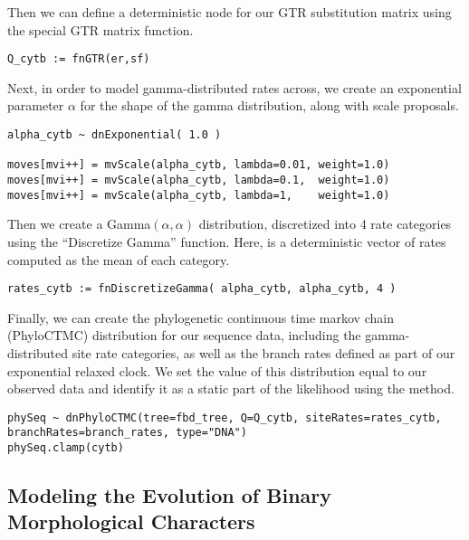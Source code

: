 Then we can define a deterministic node for our GTR substitution matrix using the special GTR matrix function.
{\tt \begin{snugshade*}
\begin{lstlisting}
Q_cytb := fnGTR(er,sf)
\end{lstlisting}
\end{snugshade*}}

Next, in order to model gamma-distributed rates across, we create an exponential parameter $\alpha$ for the shape of the gamma distribution, along with scale proposals.
{\tt \begin{snugshade*}
\begin{lstlisting}
alpha_cytb ~ dnExponential( 1.0 )

moves[mvi++] = mvScale(alpha_cytb, lambda=0.01, weight=1.0)
moves[mvi++] = mvScale(alpha_cytb, lambda=0.1,  weight=1.0)
moves[mvi++] = mvScale(alpha_cytb, lambda=1,    weight=1.0)
\end{lstlisting}
\end{snugshade*}}

Then we create a Gamma$(\alpha,\alpha)$ distribution, discretized into 4 rate categories using the ``Discretize Gamma'' function.
Here,  is a deterministic vector of rates computed as the mean of each category.
{\tt \begin{snugshade*}
\begin{lstlisting}
rates_cytb := fnDiscretizeGamma( alpha_cytb, alpha_cytb, 4 )
\end{lstlisting}
\end{snugshade*}}

Finally, we can create the phylogenetic continuous time markov chain (PhyloCTMC) distribution for our sequence data, including the gamma-distributed site rate categories, as well as the branch rates defined as part of our exponential relaxed clock.
We set the value of this distribution equal to our observed data and identify it as a static part of the likelihood using the  method.
{\tt \begin{snugshade*}
\begin{lstlisting}
phySeq ~ dnPhyloCTMC(tree=fbd_tree, Q=Q_cytb, siteRates=rates_cytb, branchRates=branch_rates, type="DNA")
phySeq.clamp(cytb)
\end{lstlisting}
\end{snugshade*}}

\bigskip

\subsection{Modeling the Evolution of Binary Morphological Characters}\label{subsect:RB-ModelMorph}

